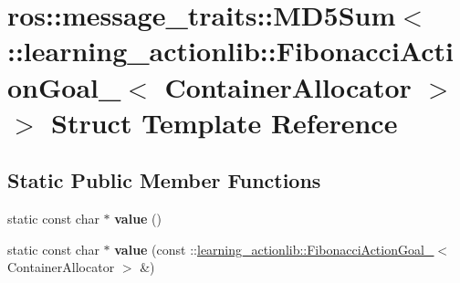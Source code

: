 \hypertarget{structros_1_1message__traits_1_1MD5Sum_3_01_1_1learning__actionlib_1_1FibonacciActionGoal___3_01ContainerAllocator_01_4_01_4}{}\section{ros\+:\+:message\+\_\+traits\+:\+:M\+D5\+Sum$<$ \+:\+:learning\+\_\+actionlib\+:\+:Fibonacci\+Action\+Goal\+\_\+$<$ Container\+Allocator $>$ $>$ Struct Template Reference}
\label{structros_1_1message__traits_1_1MD5Sum_3_01_1_1learning__actionlib_1_1FibonacciActionGoal___3_01ContainerAllocator_01_4_01_4}
\subsection*{Static Public Member Functions}
\begin{DoxyCompactItemize}
\item 
\mbox{\label{structros_1_1message__traits_1_1MD5Sum_3_01_1_1learning__actionlib_1_1FibonacciActionGoal___3_01ContainerAllocator_01_4_01_4_ab1346d4626be4af90ab78abe657eb818}} 
static const char $\ast$ {\bfseries value} ()
\item 
\mbox{\label{structros_1_1message__traits_1_1MD5Sum_3_01_1_1learning__actionlib_1_1FibonacciActionGoal___3_01ContainerAllocator_01_4_01_4_afe8505a7c42a042bc696815d5120ba7b}} 
static const char $\ast$ {\bfseries value} (const \+::\hyperlink{structlearning__actionlib_1_1FibonacciActionGoal__}{learning\+\_\+actionlib\+::\+Fibonacci\+Action\+Goal\+\_\+}$<$ Container\+Allocator $>$ \&)
\end{DoxyCompactItemize}
